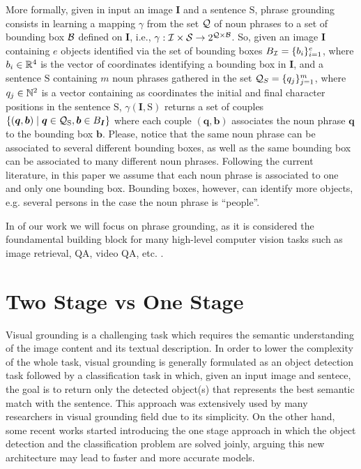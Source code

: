 More formally, given in input an image $\bm{I}$ and a sentence
$\mathrm{S}$, phrase grounding consists in learning a mapping $\gamma$
from the set $\mathcal{Q}$ of noun phrases to a set of bounding box $\mathcal{B}$
defined on $\bm{I}$, i.e., $\gamma : \mathcal{I} \times \mathcal{S} \rightarrow
2^{\mathcal{Q} \times \mathcal{B}}$. So, given an image $\bm{I}$ containing $e$
objects identified via the set of bounding boxes $B_{\mathcal{I}} = \{ b_i
\}^e_{i=1}$, where $b_i \in \mathbb{R}^4$ is the vector of coordinates
identifying a bounding box in $\bm{I}$, and a sentence $\mathrm{S}$
containing $m$ noun phrases gathered in the set $\mathcal{Q}_S = \{ q_j
\}^m_{j=1}$, where $q_j \in \mathbb{N}^2$ is a vector containing as
coordinates the initial and final character positions in the sentence
$\mathrm{S}$, $\gamma(\bm{I}, \mathrm{S})$ returns a set of couples
$\{ (\bm{q}, \bm{b}) \mid \bm{q} \in \mathcal{Q}_{\mathrm{S}}, \bm{b} \in
B_{\bm{I}} \}$ where each couple $(\bm{q}, \bm{b})$ associates the
noun phrase $\bm{q}$ to the bounding box $\bm{b}$. Please, notice that
the same noun phrase can be associated to several different bounding
boxes, as well as the same bounding box can be associated to many
different noun phrases. Following the current literature, in this
paper we assume that each noun phrase is associated to one and only
one bounding box. Bounding boxes, however, can identify more objects,
e.g. several persons in the case the noun phrase is ``people''.

\newthought In of our work we will focus on phrase grounding, as it is
considered the foundamental building block for many high-level
computer vision tasks such as image retrieval, QA, video QA, etc.
 .

\cite{conser2019revisiting} 

\section{Two Stage vs One Stage}
\label{sec:two-stage-vs-one-stage}

Visual grounding is a challenging task which requires the semantic
understanding of the image content and its textual description. In
order to lower the complexity of the whole task, visual grounding is
generally formulated as an object detection task followed by a
classification task in which, given an input image and sentece, the
goal is to return only the detected object(s) that represents the best
semantic match with the sentence. This approach was extensively used
by many researchers in visual grounding field  due to its simplicity. On the
other hand, some recent works started introducing the one stage
approach in which the object detection and the classification problem
are solved joinly, arguing this new architecture may lead to faster
and more accurate models.

